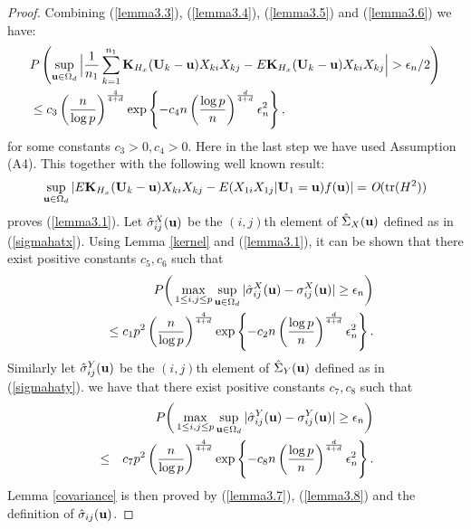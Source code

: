 \documentclass[11pt]{article}
\theoremstyle{definition}
\begin{document}
\begin{proof}
 	Combining (\ref{lemma3.3}), (\ref{lemma3.4}), (\ref{lemma3.5}) and (\ref{lemma3.6}) we have:
 	\begin{align*}
 		&P\left(\sup_{{\bf u}\in \Omega_d}\Big|\frac{1}{n_1}\sum_{k=1}^{n_1}{\bf K}_{H_x}({\bf U}_k-{\bf u})X_{ki}X_{kj}-E{\bf K}_{H_x}({\bf U}_k-{\bf u})X_{ki}X_{kj}\Big|>\epsilon_n/2 \right) \\
 		&\leq c_3\left(\frac{n}{\log p}\right)^{\frac{4}{4+d}}\exp\left\{-c_4n \left(\frac{\log p}{n}\right)^{\frac{d}{4+d}}\epsilon_n^2\right\}, \nonumber
 	\end{align*}
 	for some constants $c_3>0, c_4>0$. Here in the last step we have used Assumption (A4). This together with the following well known result:
 	\begin{eqnarray*}
 		\sup_{{\bf u}\in \Omega_d}|E{\bf K}_{H_x}({\bf U}_k-{\bf u})X_{ki}X_{kj}-E(X_{1i}X_{1j}|{\bf U}_1={\bf u})f({\bf u})|=\emph{O}({\rm tr}(H^2))
 	\end{eqnarray*}
 	proves (\ref{lemma3.1}). Let $\hat{\sigma}_{ij}^X({\bf u})$ be the $(i,j)$th element of $\hat{\Sigma}_X({\bf u})$ defined as in (\ref{sigmahatx}). Using Lemma \ref{kernel} and  (\ref{lemma3.1}), it can be shown that there exist positive constants $c_5, c_6$ such that
 	\begin{eqnarray}\label{lemma3.7}
 		&&P\bigg(\max_{1\leq i,j\leq p}\sup_{{\bf u}\in \Omega_d}|\hat{\sigma}_{ij}^X({\bf u})-\sigma_{ij}^X({\bf u})|\geq \epsilon_n\bigg) \\
 		&&\leq c_1p^2\left(\frac{n}{\log p}\right)^{\frac{4}{4+d}}\exp\left\{-c_2n \left(\frac{\log p}{n}\right)^{\frac{d}{4+d}}\epsilon_n^2\right\}. \nonumber
 	\end{eqnarray}
 	Similarly let $\hat{\sigma}_{ij}^Y({\bf u})$ be the $(i,j)$th element of $\hat{\Sigma}_Y({\bf u})$ defined as in (\ref{sigmahaty}). we have that there exist positive constants $c_7, c_8$ such that
 	\begin{eqnarray}\label{lemma3.8}
 		&&P\bigg(\max_{1\leq i,j\leq p}\sup_{{\bf u}\in \Omega_d}|\hat{\sigma}_{ij}^Y({\bf u})-\sigma_{ij}^Y({\bf u})|\geq \epsilon_n\bigg) \\
 		&\leq& c_7p^2\left(\frac{n}{\log p}\right)^{\frac{4}{4+d}}\exp\left\{-c_8n \left(\frac{\log p}{n}\right)^{\frac{d}{4+d}}\epsilon_n^2\right\}. \nonumber
 	\end{eqnarray}
 	Lemma \ref{covariance} is then proved by (\ref{lemma3.7}), (\ref{lemma3.8}) and the definition of $\hat{\sigma}_{ij}({\bf u})$.
 \end{proof}
 
\end{document}
